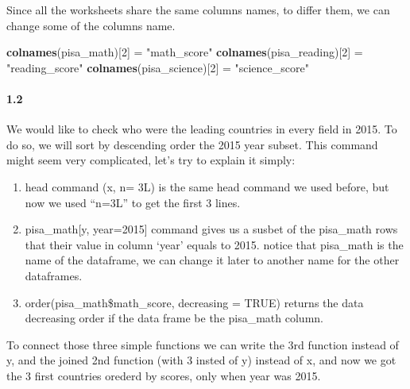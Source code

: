 \documentclass[]{article}
\newenvironment{Shaded}{\begin{snugshade}}{\end{snugshade}}
\newcommand{\KeywordTok}[1]{\textcolor[rgb]{0.13,0.29,0.53}{\textbf{#1}}}
\newcommand{\DataTypeTok}[1]{\textcolor[rgb]{0.13,0.29,0.53}{#1}}
\newcommand{\DecValTok}[1]{\textcolor[rgb]{0.00,0.00,0.81}{#1}}
\newcommand{\StringTok}[1]{\textcolor[rgb]{0.31,0.60,0.02}{#1}}
\newcommand{\OtherTok}[1]{\textcolor[rgb]{0.56,0.35,0.01}{#1}}
\newcommand{\OperatorTok}[1]{\textcolor[rgb]{0.81,0.36,0.00}{\textbf{#1}}}
\newcommand{\NormalTok}[1]{#1}
\let\oldparagraph\paragraph
\renewcommand{\paragraph}[1]{\oldparagraph{#1}\mbox{}}
\begin{document}
Since all the worksheets share the same columns names, to differ them,
we can change some of the columns name.

\begin{Shaded}
\begin{Highlighting}[]
\KeywordTok{colnames}\NormalTok{(pisa_math)[}\DecValTok{2}\NormalTok{] =}\StringTok{ "math_score"}
\KeywordTok{colnames}\NormalTok{(pisa_reading)[}\DecValTok{2}\NormalTok{] =}\StringTok{ "reading_score"}
\KeywordTok{colnames}\NormalTok{(pisa_science)[}\DecValTok{2}\NormalTok{] =}\StringTok{ "science_score"}  
\end{Highlighting}
\end{Shaded}

\paragraph{1.2}\label{section-1}

We would like to check who were the leading countries in every field in
2015. To do so, we will sort by descending order the 2015 year subset.
This command might seem very complicated, let's try to explain it
simply:

\begin{enumerate}
\def\labelenumi{\arabic{enumi}.}
\item
  head command (x, n= 3L) is the same head command we used before, but
  now we used ``n=3L'' to get the first 3 lines.
\item
  pisa\_math{[}y, year=2015{]} command gives us a susbet of the
  pisa\_math rows that their value in column `year' equals to 2015.
  notice that pisa\_math is the name of the dataframe, we can change it
  later to another name for the other dataframes.
\item
  order(pisa\_math\$math\_score, decreasing = TRUE) returns the data
  decreasing order if the data frame be the pisa\_math column.
\end{enumerate}

To connect those three simple functions we can write the 3rd function
instead of y, and the joined 2nd function (with 3 insted of y) instead
of x, and now we got the 3 first countries orederd by scores, only when
year was 2015.

\begin{Shaded}
\end{Shaded}
\end{document}
